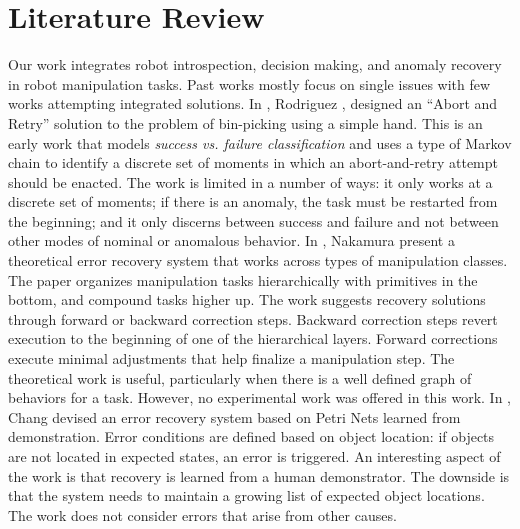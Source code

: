 \documentclass[letterpaper, 10 pt, conference]{ieeeconf}  %
\begin{document}
\section{Literature Review} \label{sec:lit_review}
Our work integrates robot introspection, decision making, and anomaly recovery in robot manipulation tasks. Past works mostly focus on single issues with few works attempting integrated solutions. 
In \cite{2011IROS-Rodriguez-AbortRetry}, Rodriguez \et, designed an ``Abort and Retry'' solution to the problem of bin-picking using a simple hand. This is an early work that models \textit{success vs. failure classification} and uses a type of Markov chain to identify a discrete set of moments in which an abort-and-retry attempt should be enacted. The work is limited in a number of ways: it only works at a discrete set of moments; if there is an anomaly, the task must be restarted from the beginning; and it only discerns between success and failure and not between other modes of nominal or anomalous behavior. 
In \cite{2013IROS-Nakamura-ErrorRecTaskStrat}, Nakamura \et present a theoretical error recovery system that works across types of manipulation classes. The paper organizes manipulation tasks hierarchically with primitives in the bottom, and compound tasks higher up. The work suggests recovery solutions through forward or backward correction steps. Backward correction steps revert execution to the beginning of one of the hierarchical layers. Forward corrections execute minimal adjustments that help finalize a manipulation step. The theoretical work is useful, particularly when there is a well defined graph of behaviors for a task. However, no experimental work was offered in this work. 
In \cite{2013ICAR-Chang-BotTaskRecovery_PetriNets_LfD}, Chang \et devised an error recovery system based on Petri Nets learned from demonstration. Error conditions are defined based on object location: if objects are not located in expected states, an error is triggered. An interesting aspect of the work is that recovery is learned from a human demonstrator. The downside is that the system needs to maintain a growing list of expected object locations. The work does not consider errors that arise from other causes. 
\end{document}
